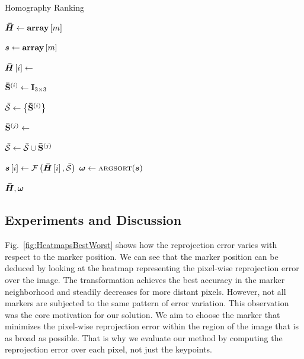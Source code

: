 \begin{algorithm}[t]
    \caption{Homography Ranking}
    \label{alg:homography_ranking}
    \begin{algorithmic}[1]
        \State $\boldsymbol{\bar{H}} \gets {\text{\textbf{array}}} \left[ m \right]$
        
        \State $\boldsymbol{s} \gets {\text{\textbf{array}}} \left[ m \right]$
        
        
            \State $\boldsymbol{\bar{H}} \left[ i \right] \gets$
            
            \State ${\mathbf{\bar{S}}}^{\left( {i} \right)} \gets \mathbf{I}_{3 \times 3}$
            
            \State $\mathcal{\bar{S}} \gets \left\{ {{\mathbf{\bar{S}}}^{\left( {i} \right)}} \right\}$
            
            
                \State ${\mathbf{\bar{S}}}^{\left( {j} \right)} \gets$ 
                
                \State$\mathcal{\bar{S}} \gets \mathcal{\bar{S}} \cup {\mathbf{\bar{S}}}^{\left( {j} \right)}$
            \EndFor
            
            \State $\boldsymbol{s} \left[ i \right] \gets {\mathcal{F}} \left( \boldsymbol{\bar{H}} \left[ i \right], \mathcal{\bar{S}} \right)$
        \EndFor
        \State $\sortres \gets \Call{argsort}{\scores}$
        
        \State \Return $\boldsymbol{\bar{H}}, \boldsymbol{\omega}$
    \end{algorithmic}
\end{algorithm}

\subsection{Experiments and Discussion}

Fig.~\ref{fig:HeatmapsBestWorst} shows how the reprojection error varies with respect to the marker position. We can see that the marker position can be deduced by looking at the heatmap representing the pixel-wise reprojection error over the image. The transformation achieves the best accuracy in the marker neighborhood and steadily decreases for more distant pixels. However, not all markers are subjected to the same pattern of error variation. This observation was the core motivation for our solution. We aim to choose the marker that minimizes the pixel-wise reprojection error within the region of the image that is as broad as possible. That is why we evaluate our method by computing the reprojection error over each pixel, not just the keypoints.

